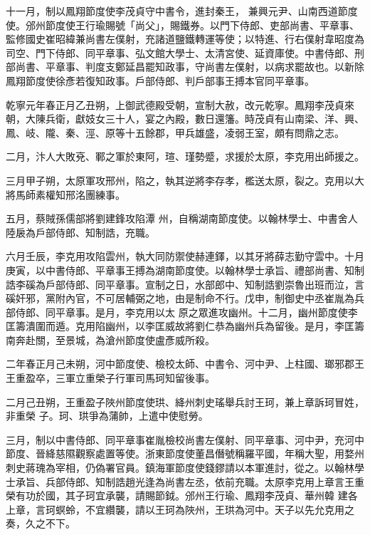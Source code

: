 \begin{pinyinscope}
 十一月，制以鳳翔節度使李茂貞守中書令，進封秦王，
 兼興元尹、山南西道節度使。邠州節度使王行瑜賜號「尚父」，賜鐵券。以門下侍郎、吏部尚書、平章事、監修國史崔昭緯兼尚書左僕射，充諸道鹽鐵轉運等使；以特進、行右僕射韋昭度為司空、門下侍郎、同平章事、弘文館大學士、太清宮使、延資庫使。中書侍郎、刑部尚書、平章事、判度支鄭延昌罷知政事，守尚書左僕射，以病求罷故也。以新除鳳翔節度使徐彥若復知政事。戶部侍郎、判戶部事王搏本官同平章事。



 乾寧元年春正月乙丑朔，上御武德殿受朝，宣制大赦，改元乾寧。鳳翔李茂貞來朝，大陳兵衛，獻妓女三十人，宴之內殿，數日還籓。時茂貞有山南梁、洋、興、鳳、岐、隴、秦、涇、原等十五餘郡，甲兵雄盛，凌弱王室，頗有問鼎之志。



 二月，汴人大敗兗、鄆之軍於東阿，瑄、瑾勢蹙，求援於太原，李克用出師援之。



 三月甲子朔，太原軍攻邢州，陷之，執其逆將李存孝，檻送太原，裂之。克用以大將馬師素權知邢洺團練事。



 五月，蔡賊孫儒部將劉建鋒攻陷潭
 州，自稱湖南節度使。以翰林學士、中書舍人陸扆為戶部侍郎、知制誥，充職。



 六月壬辰，李克用攻陷雲州，執大同防禦使赫連鐸，以其牙將薛志勤守雲中。十月庚寅，以中書侍郎、平章事王搏為湖南節度使。以翰林學士承旨、禮部尚書、知制誥李磎為戶部侍郎、同平章事。宣制之日，水部郎中、知制誥劉崇魯出班而泣，言磎奸邪，黨附內官，不可居輔弼之地，由是制命不行。戊申，制御史中丞崔胤為兵部侍郎、同平章事。是月，李克用以太
 原之眾進攻幽州。十二月，幽州節度使李匡籌潰圍而遁。克用陷幽州，以李匡威故將劉仁恭為幽州兵為留後。是月，李匡籌南奔赴關，至景城，為滄州節度使盧彥威所殺。



 二年春正月己未朔，河中節度使、檢校太師、中書令、河中尹、上柱國、瑯邪郡王王重盈卒，三軍立重榮子行軍司馬珂知留後事。



 二月己丑朔，王重盈子陜州節度使珙、絳州刺史瑤舉兵討王珂，兼上章訴珂冒姓，非重榮
 子。珂、珙爭為蒲帥，上遣中使慰勞。



 三月，制以中書侍郎、同平章事崔胤檢校尚書左僕射、同平章事、河中尹，充河中節度、晉絳慈隰觀察處置等使。浙東節度使董昌僭號稱羅平國，年稱大聖，用婺州刺史蔣瑰為宰相，仍偽署官員。鎮海軍節度使錢鏐請以本軍進討，從之。以翰林學士承旨、兵部侍郎、知制誥趙光逢為尚書左丞，依前充職。太原李克用上章言王重榮有功於國，其子珂宜承襲，請賜節鉞。邠州王行瑜、鳳翔李茂貞、華州韓
 建各上章，言珂螟蛉，不宜纘襲，請以王珂為陜州，王珙為河中。天子以先允克用之奏，久之不下。




\end{pinyinscope}
